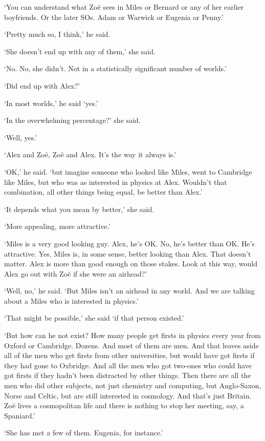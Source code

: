 `You can understand what Zoë sees in Miles or Bernard or any
of her earlier boyfriends. Or the later SOs. Adam or Warwick or Eugenia or Penny.'

`Pretty much so, I think,' he said.

`She doesn't end up with any of them,' she said.

`No. No, she didn't. Not in a statistically significant
number of worlds.'

`Did end up with Alex?'

`In most worlds,' he said `yes.'

`In the overwhelming percentage?' she said.

`Well, yes.'

`Alex and Zoë, Zoë and Alex. It's the way it
always is.'

`OK,' he said. `but imagine someone who looked like Miles, went to Cambridge
like Miles, but who was as interested in physics at Alex. Wouldn't
that combination, all other things being equal, be better than
Alex.'

`It depends what you mean by better,' she said.

`More appealing, more attractive.'

`Miles is a very good looking guy. Alex, he's OK. No, he's
better than OK. He's attractive. Yes, Miles is, in some sense,
better looking than Alex. That doesn't matter. Alex is more than
good enough on those stakes. Look at this way, would Alex go out
with Zoë if she were an airhead?'

`Well, no,' he said. `But Miles isn't an airhead in any world. And we are
talking about a Miles who is interested in physics.'

`That might be possible,' she said `if that person existed.'

`But how can he not exist? How many people get firsts in physics every year from Oxford or Cambridge. Dozens. And most of them are men. And that leaves aside all of the men who get firsts from other universities, but would have got firsts if they had gone to Oxbridge. And all the men who got two-ones who could have got firsts if they hadn't been distracted by other things. Then there are all the men who did other subjects, not just chemistry and computing, but Anglo-Saxon, Norse and Celtic, but are still interested in cosmology. And that's just Britain. Zoë lives a cosmopolitan life and there is nothing to stop her meeting, say, a Spaniard.'

`She has met a few of them. Eugenia, for instance.'

